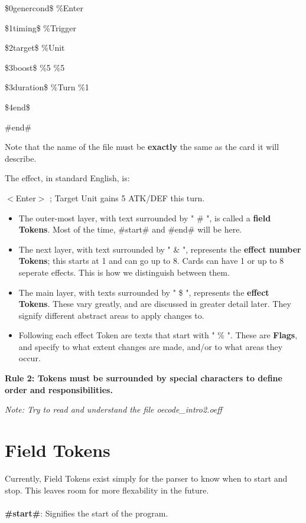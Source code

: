 \documentclass[12pt,letterpaper]{article}
\begin{document}
\quad \$0genercond\$ \%Enter

\quad \$1timing\$ \%Trigger

\quad \$2target\$ \%Unit

\quad \$3boost\$ \%5 \%5

\quad \$3duration\$ \%Turn \%1

\quad \$4end\$

\#end\#

Note that the name of the file must be \textbf{exactly} the same as the card it will describe.

The effect, in standard English, is:

$<$Enter$>$ ; Target Unit gains 5 ATK/DEF this turn.

\begin{itemize}
\item
	The outer-most layer, with text surrounded by " \# ", is called a \textbf{field Tokens}. Most of the time, \#start\# and \#end\# will be here.
\item
	The next layer, with text surrounded by " \& ", represents the \textbf{effect number Tokens}; this starts at 1 and can go up to 8. Cards can have 1 or up to 8 seperate effects. This is how we distinguish between them. 
\item
	The main layer, with texts surrounded by " \$ ", represents the \textbf{effect Tokens}. These vary greatly, and are discussed in greater detail later. They signify different abstract areas to apply changes to.
\item
	Following each effect Token are texts that start with " \% ". These are \textbf{Flags}, and specify to what extent changes are made, and/or to what areas they occur.
\end{itemize}

\textbf{Rule 2: Tokens must be surrounded by special characters to define order and responsibilities.}

\textit{Note: Try to read and understand the file oecode\_intro2.oeff}

\section{Field Tokens}

Currently, Field Tokens exist simply for the parser to know when to start and stop. This leaves room for more flexability in the future.
\\\\
\textbf{\#start\#}: Signifies the start of the program. 
\end{document}
